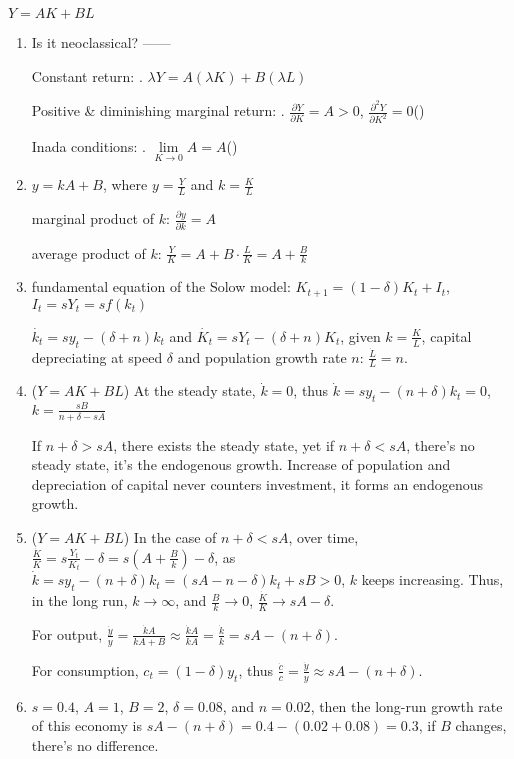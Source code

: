\documentclass{article}
\newcommand{\tmcolor}[2]{{\color{#1}{#2}}}
\newcommand{\tmtextbf}[1]{\text{{\bfseries{#1}}}}
\newenvironment{enumeratealpha}{\begin{enumerate}[a{\textup{)}}] }{\end{enumerate}}
\begin{document}
\begin{question}
  \tmtextbf{AK Model} $Y = A K + B L$
\end{question}
\begin{enumeratealpha}
  \item Is it neoclassical? ------\tmcolor{red}{NO}
  
  Constant return: \tmcolor{red}{YES}. $\lambda Y = A (\lambda K) + B (\lambda
  L)$
  
  Positive \& diminishing marginal return: \tmcolor{red}{NO}. $\frac{\partial
  Y}{\partial K} = A > 0$, $\frac{\partial^2 Y}{\partial K^2} =
  0$(\tmcolor{red}{{\times}})
  
  Inada conditions: \tmcolor{red}{NO}. $\underset{K \rightarrow 0}{\lim} A =
  A$(\tmcolor{red}{{\times}})
  
  \item $y = k A + B$, where $y = \frac{Y}{L}$ and $k = \frac{K}{L}$
  
  marginal product of $k$: $\frac{\partial y}{\partial k} = A$
  
  average product of $k$: $\frac{Y}{K} = A + B \cdot \frac{L}{K} = A +
  \frac{B}{k}$
  
  \item fundamental equation of the Solow model: $K_{t + 1} = (1 - \delta) K_t
  + I_t$, $I_t = s Y_t = s f (k_t)$
  
  $\dot{k_t} = s y_t - (\delta + n) k_t$ and $\dot{K_t} = s Y_t - (\delta + n)
  K_t$, given $k = \frac{K}{L}$, capital depreciating at speed $\delta$ and
  population growth rate $n$: $\frac{\dot{L}}{L} = n$.
  
  \item ($Y = A K + B L$) At the steady state, $\dot{k} = 0$, thus $\dot{k} =
  s y_t - (n + \delta) k_t = 0$, $k = \frac{s B}{n + \delta - s A}$
  
  If $n + \delta > s A$, there exists the steady state, yet if $n + \delta < s
  A$, there's no steady state, it's the endogenous growth. Increase of
  population and depreciation of capital never counters investment, it forms
  an endogenous growth.
  
  \item ($Y = A K + B L$) In the case of $n + \delta < s A$, over time,
  $\frac{\dot{K}}{K} = s \frac{Y_t}{K_t} - \delta = s \left( A + \frac{B}{k}
  \right) - \delta$, as $\dot{k} = s y_t - (n + \delta) k_t = (s A - n -
  \delta) k_t + s B > 0$, $k$ keeps increasing. Thus, in the long run, $k
  \rightarrow \infty$, and $\frac{B}{k} \rightarrow 0$, $\frac{\dot{K}}{K}
  \rightarrow s A - \delta$.
  
  For output, $\frac{\dot{y}}{y} = \frac{\dot{k} A}{k A + B} \approx
  \frac{\dot{k} A}{k A} = \frac{\dot{k}}{k} = s A - (n + \delta)$.
  
  For consumption, $c_t = (1 - \delta) y_t$, thus $\frac{\dot{c}}{c} =
  \frac{\dot{y}}{y} \approx s A - (n + \delta)$.
  
  \item $s = 0.4$, $A = 1$, $B = 2$, $\delta = 0.08$, and $n = 0.02$, then the
  long-run growth rate of this economy is $s A - (n + \delta) = 0.4 - (0.02 +
  0.08) = 0.3$, if $B$ changes, there's no difference.
\end{enumeratealpha}
\end{document}
